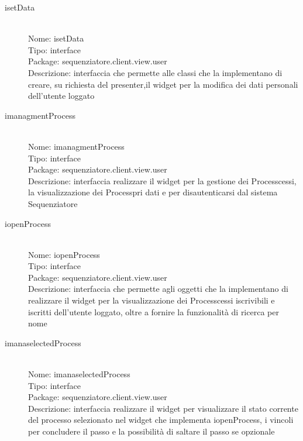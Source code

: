 \begin{description}
	\item[isetData] 
  	\hfill \\
  	Nome: isetData\\
  	Tipo: interface\\
	Package: sequenziatore.client.view.user\\
	Descrizione: interfaccia che permette alle classi che la implementano di creare, su richiesta del presenter,il widget per la modifica dei dati personali dell'utente loggato
\end{description}

\begin{description}
	\item[imanagmentProcess] 
  	\hfill \\
  	Nome: imanagmentProcess\\
  	Tipo: interface\\
	Package: sequenziatore.client.view.user\\
	Descrizione: interfaccia realizzare il widget per la gestione dei Processcessi, la visualizzazione dei Processpri dati e per disautenticarsi dal sistema Sequenziatore
\end{description}

\begin{description}
	\item[iopenProcess] 
  	\hfill \\
  	Nome: iopenProcess\\
  	Tipo: interface\\
	Package: sequenziatore.client.view.user\\
	Descrizione: interfaccia che permette agli oggetti che la implementano di realizzare il widget per la visualizzazione dei Processcessi iscrivibili e iscritti dell'utente loggato, oltre a fornire la funzionalità di ricerca per nome
\end{description}

\begin{description}
	\item[imanaselectedProcess] 
  	\hfill \\
  	Nome: imanaselectedProcess\\
  	Tipo: interface\\
	Package: sequenziatore.client.view.user\\
	Descrizione: interfaccia realizzare il widget per visualizzare il stato corrente del processo selezionato nel widget che implementa iopenProcess, i vincoli per concludere il passo e la possibilità di saltare il passo se opzionale
\end{description}

